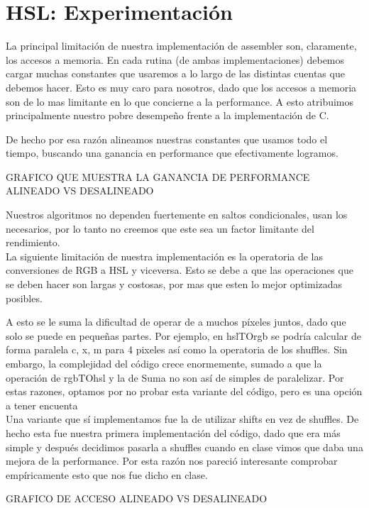 \section*{HSL: Experimentación}

La principal limitación de nuestra implementación de assembler son, claramente, los accesos a memoria. En cada rutina (de ambas implementaciones) debemos cargar muchas constantes que usaremos a lo largo de las distintas cuentas que debemos hacer.
Esto es muy caro para nosotros, dado que los accesos a memoria son de lo mas limitante en lo que concierne a la performance. 
A esto atribuimos principalmente nuestro pobre desempeño frente a la implementación de C.

De hecho por esa razón alineamos nuestras constantes que usamos todo el tiempo, buscando una ganancia en performance que efectivamente logramos.

GRAFICO QUE MUESTRA LA GANANCIA DE PERFORMANCE ALINEADO VS DESALINEADO

Nuestros algoritmos no dependen fuertemente en saltos condicionales, usan los necesarios, por lo tanto no creemos que este sea un factor limitante del rendimiento.
\\

La siguiente limitación de nuestra implementación es la operatoria de las conversiones de RGB a HSL y viceversa. Esto se debe a que las operaciones que se deben hacer son largas y costosas, por mas que esten lo mejor optimizadas posibles.

A esto se le suma la dificultad de operar de a muchos píxeles juntos, dado que solo se puede en pequeñas partes.
Por ejemplo, en hslTOrgb se podría calcular de forma paralela c, x, m para 4 pixeles así como la operatoria de los shuffles.
Sin embargo, la complejidad del código crece enormemente, sumado a que la operación de rgbTOhsl y la de Suma no son así de simples de paralelizar.
Por estas razones, optamos por no probar esta variante del código, pero es una opción a tener encuenta
\\

Una variante que sí implementamos fue la de utilizar shifts en vez de shuffles. De hecho esta fue nuestra primera implementación del código, dado que era más simple y después decidimos pasarla a shuffles cuando en clase vimos que daba una mejora de la performance. Por esta razón nos pareció interesante comprobar empíricamente esto que nos fue dicho en clase.

GRAFICO DE ACCESO ALINEADO VS DESALINEADO






